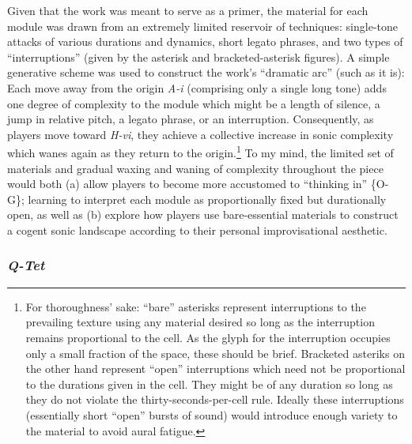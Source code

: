    Given that the work was meant to serve as a primer, the material for each module was drawn from an extremely limited reservoir of techniques: single-tone attacks of various durations and dynamics, short legato phrases, and two types of ``interruptions'' (given by the asterisk and bracketed-asterisk figures). A simple generative scheme was used to construct the work's ``dramatic arc'' (such as it is): Each move away from the origin \textit{A-i} (comprising only a single long tone) adds one degree of complexity to the module which might be a length of silence, a jump in relative pitch, a legato phrase, or an interruption. Consequently, as players move toward \textit{H-vi}, they achieve a collective increase in sonic complexity which wanes again as they return to the origin.\footnote{For thoroughness' sake: ``bare'' asterisks represent interruptions to the prevailing texture using any material desired so long as the interruption remains proportional to the cell. As the glyph for the interruption occupies only a small fraction of the space, these should be brief. Bracketed asteriks on the other hand represent ``open'' interruptions which need not be proportional to the durations given in the cell. They might be of any duration so long as they do not violate the thirty-seconds-per-cell rule. Ideally these interruptions (essentially short ``open'' bursts of sound) would introduce enough variety to the material to avoid aural fatigue.} To my mind, the limited set of materials and gradual waxing and waning of complexity throughout the piece would both (a) allow players to become more accustomed to ``thinking in'' \{O-G\}; learning to interpret each module as proportionally fixed but durationally open, as well as (b) explore how players use bare-essential materials to construct a cogent sonic landscape according to their personal improvisational aesthetic.

    \subsubsection{\textit{Q-Tet}}

